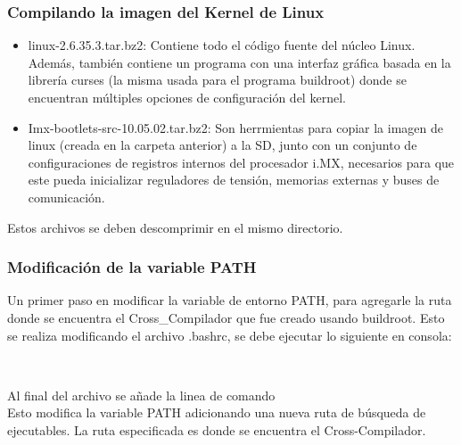 \documentclass[12pt]{article}
\begin{document}
\subsubsection{Compilando la imagen del Kernel de Linux}
\noindent
\begin{itemize}
 \item linux-2.6.35.3.tar.bz2: Contiene todo el código fuente del núcleo Linux. Además, también contiene un programa con una interfaz gráfica basada en la librería curses (la misma usada para el programa buildroot) donde se encuentran múltiples opciones de configuración del kernel.
 \item Imx-bootlets-src-10.05.02.tar.bz2: Son herrmientas para copiar la imagen de linux (creada en la carpeta anterior) a la SD, junto con un conjunto de configuraciones de registros internos del procesador i.MX, necesarios para que este pueda inicializar reguladores de tensión, memorias externas y buses de comunicación.
\end{itemize}
\noindent
Estos archivos se deben descomprimir en el mismo directorio.

\subsubsection{Modificación de la variable PATH}
\noindent
Un primer paso en modificar la variable de entorno PATH, para agregarle la ruta donde se encuentra el Cross\_Compilador que fue creado usando buildroot. Esto se realiza modificando el archivo .bashrc, se debe ejecutar lo siguiente en consola:

\begin{center}
  \\
\end{center}
\noindent
Al final del archivo se añade la linea de comando\\
\noindent
Esto modifica la variable PATH adicionando una nueva ruta de búsqueda de ejecutables. La ruta especificada es donde se encuentra el Cross-Compilador.
\end{document}
